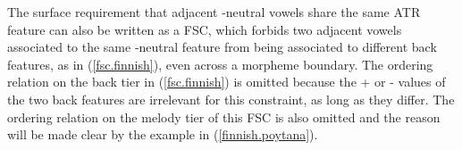 \documentclass[floatsintext,man]{apa6}
\theoremstyle{definition}
\theoremstyle{definition}
\theoremstyle{definition}
\theoremstyle{remark}
\begin{document}
The surface requirement that adjacent -neutral vowels share the same ATR
feature can also be written as a FSC, which forbids two adjacent vowels
associated to the same -neutral feature from being associated to
different back features, as in (\ref{fsc.finnish}), even across a
morpheme boundary. The ordering relation on the back tier in
(\ref{fsc.finnish}) is omitted because the + or - values of the two back
features are irrelevant for this constraint, as long as they differ. The
ordering relation on the melody tier of this FSC is also omitted and the
reason will be made clear by the example in (\ref{finnish.poytana}).

\begin{exe}
\ex \label{fsc.finnish}
\end{exe}
\end{document}

